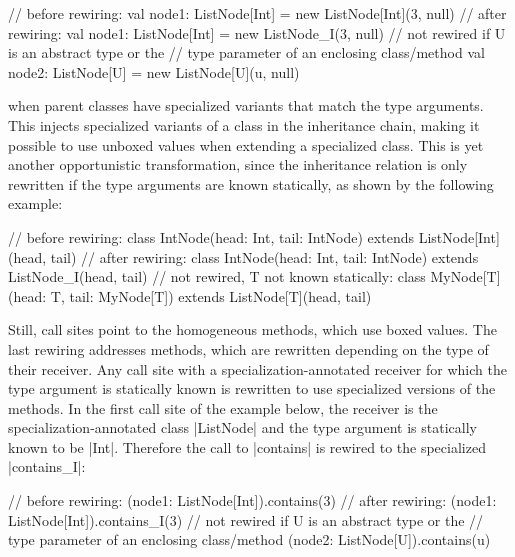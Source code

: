 \begin{lstlisting-nobreak}
 // before rewiring:
 val node1: ListNode[Int] =
        new ListNode[Int](3, null)
 // after rewiring:
 val node1: ListNode[Int] =
        new ListNode_I(3, null)
 // not rewired if U is an abstract type or the
 // type parameter of an enclosing class/method
 val node2: ListNode[U] =
        new ListNode[U](u, null)
\end{lstlisting-nobreak}

 when parent classes have specialized variants that match the type arguments. This injects specialized variants of a class in the inheritance chain, making it possible to use unboxed values when extending a specialized class. This is yet another opportunistic transformation, since the inheritance relation is only rewritten if the type arguments are known statically, as shown by the following example:

\begin{lstlisting-nobreak}
 // before rewiring:
 class IntNode(head: Int, tail: IntNode)
         extends ListNode[Int](head, tail)
 // after rewiring:
 class IntNode(head: Int, tail: IntNode)
         extends ListNode_I(head, tail)
 // not rewired, T not known statically:
 class MyNode[T](head: T, tail: MyNode[T])
         extends ListNode[T](head, tail)
\end{lstlisting-nobreak}

 Still, call sites point to the homogeneous methods, which use boxed values. The last rewiring addresses methods, which are rewritten depending on the type of their receiver. Any call site with a specialization-annotated receiver for which the type argument is statically known is rewritten to use specialized versions of the methods. In the first call site of the example below, the receiver is the specialization-annotated class |ListNode| and the type argument is statically known to be |Int|. Therefore the call to |contains| is rewired to the specialized |contains_I|:

\begin{lstlisting-nobreak}
 // before rewiring:
 (node1: ListNode[Int]).contains(3)
 // after rewiring:
 (node1: ListNode[Int]).contains_I(3)
 // not rewired if U is an abstract type or the
 // type parameter of an enclosing class/method
 (node2: ListNode[U]).contains(u)
\end{lstlisting-nobreak}

